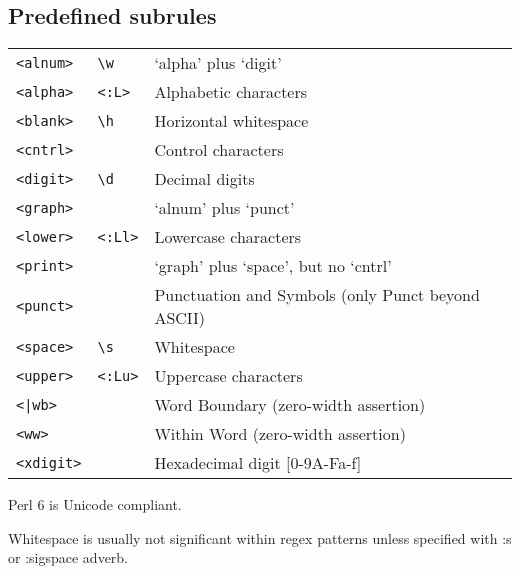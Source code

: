 \documentclass[12pt]{article}
\begin{document}
\subsection{Predefined subrules}
\begin{tabular}{lp{3cm}p{6cm}}
	\verb|<alnum>|   & \verb|\w|      & `alpha' plus `digit'\\
	\verb|<alpha>|   & \verb|<:L>|     & Alphabetic characters\\
	\verb|<blank>|   & \verb|\h|      &  Horizontal whitespace\\
	\verb|<cntrl>|  &        &   Control characters\\
	\verb|<digit>|  &  \verb|\d|   &    Decimal digits\\
	\verb|<graph>|  &       &   `alnum' plus `punct'\\
	\verb|<lower>|  & \verb|<:Ll>|  &  Lowercase characters\\
	\verb|<print>|  &       &   `graph' plus `space', but no `cntrl'\\
	\verb|<punct>|  &      &    Punctuation and Symbols (only Punct beyond ASCII)\\
	\verb|<space>| &  \verb|\s|    &   Whitespace\\
	\verb|<upper>| &  \verb|<:Lu>|  &  Uppercase characters\\
	\texttt{<|wb>}   &       &     Word Boundary (zero-width assertion)\\
	\verb|<ww>|   &       &    Within Word (zero-width assertion)\\
	\verb|<xdigit>| &     &    Hexadecimal digit [0-9A-Fa-f]\\
	
	
	
	
	
\end{tabular}

	
	Perl 6 is Unicode compliant.
	
	Whitespace is usually not significant within regex patterns unless specified with :s or :sigspace adverb.
	
	
	
	
	
	
\end{document}
